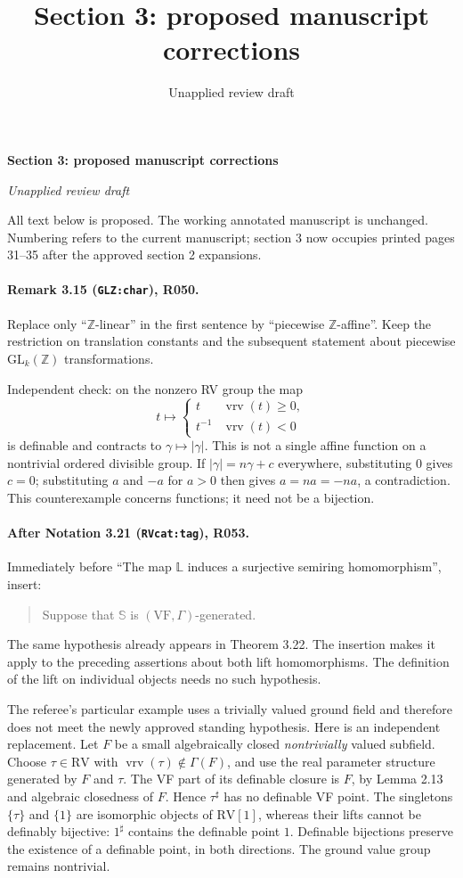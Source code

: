 \documentclass[10pt]{article}
\title{Section 3: proposed manuscript corrections}
\author{}\date{Unapplied review draft}
\newcommand{\VF}{\mathrm{VF}}\newcommand{\RV}{\mathrm{RV}}
\begin{document}
{\Large\bfseries Section 3: proposed manuscript corrections}\par\smallskip\textit{Unapplied review draft}\par\medskip
All text below is proposed. The working annotated manuscript is unchanged.
Numbering refers to the current manuscript; section 3 now occupies printed
pages 31--35 after the approved section 2 expansions.

\paragraph{Remark 3.15 (\texttt{GLZ:char}), R050.}
Replace only ``$\mathbb Z$-linear'' in the first sentence by
{\color{ResolutionGreen}``piecewise $\mathbb Z$-affine''}.
Keep the restriction on translation constants and the subsequent statement
about piecewise $\mathrm{GL}_k(\mathbb Z)$ transformations.

Independent check: on the nonzero RV group the map
\[
 t\longmapsto\begin{cases}t&\operatorname{vrv}(t)\geq0,\\
 t^{-1}&\operatorname{vrv}(t)<0\end{cases}
\]
is definable and contracts to $\gamma\mapsto|\gamma|$. This is not a
single affine function on a nontrivial ordered divisible group. If
$|\gamma|=n\gamma+c$ everywhere, substituting $0$ gives $c=0$;
substituting $a$ and $-a$ for $a>0$ then gives $a=na=-na$, a contradiction.
This counterexample concerns functions; it need not be a bijection.

\paragraph{After Notation 3.21 (\texttt{RVcat:tag}), R053.}
Immediately before ``The map $\mathbb L$ induces a surjective semiring
homomorphism'', insert:
\begin{quote}\color{ResolutionGreen}
Suppose that $\mathbb S$ is $(\VF,\Gamma)$-generated.
\end{quote}
The same hypothesis already appears in Theorem 3.22. The insertion makes
it apply to the preceding assertions about both lift homomorphisms.
The definition of the lift on individual objects needs no such hypothesis.

The referee's particular example uses a trivially valued ground field and
therefore does not meet the newly approved standing hypothesis. Here is
an independent replacement. Let $F$ be a small algebraically closed
\emph{nontrivially} valued subfield. Choose $\tau\in\RV$ with
$\operatorname{vrv}(\tau)\notin\Gamma(F)$, and use the real parameter
structure generated by $F$ and $\tau$. The VF part of its definable closure
is $F$, by Lemma 2.13 and algebraic closedness of $F$. Hence
$\tau^\sharp$ has no definable VF point. The singletons $\{\tau\}$ and
$\{1\}$ are isomorphic objects of $\RV[1]$, whereas their lifts cannot be
definably bijective: $1^\sharp$ contains the definable point $1$.
Definable bijections preserve the existence of a definable point, in both
directions. The ground value group remains nontrivial.
\end{document}
